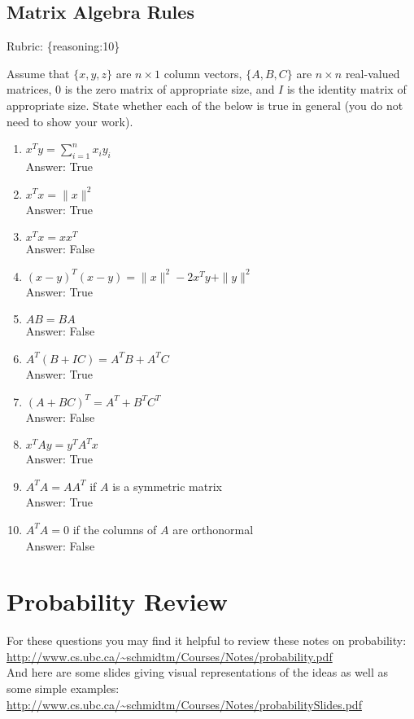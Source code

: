 \documentclass{article}
\def\rubric#1{\gre{Rubric: \{#1\}}}{}
\def\blu#1{{\color{blu}#1}}
\def\gre#1{{\color{gre}#1}}
\def\red#1{{\color{red}#1}}
\def\norm#1{\|#1\|}
\def\ans#1{\gre{Answer: #1}}{}
\begin{document}
\subsection{Matrix Algebra Rules}
\rubric{reasoning:10}

Assume that $\{x,y,z\}$ are $n \times 1$ column vectors, $\{A,B,C\}$ are $n \times n$ real-valued matrices, \red{$0$ is the zero matrix of appropriate size}, and $I$ is the identity matrix of appropriate size. \blu{State whether each of the below is true in general} (you do not need to show your work).

\begin{enumerate}
\item $x^Ty = \sum_{i=1}^n x_iy_i$ \\ \ans{True}
\item $x^Tx = \norm{x}^2$ \\ \ans{True}
\item $x^Tx = xx^T$ \\ \ans{False}
\item $(x-y)^T(x-y) = \norm{x}^2 - 2x^Ty + \norm{y}^2$ \\ \ans{True}
\item $AB=BA$ \\ \ans{False}
\item $A^T(B + IC) = A^TB + A^TC$ \\ \ans{True}
\item $(A + BC)^T = A^T + B^TC^T$ \\ \ans{False}
\item $x^TAy = y^TA^Tx$ \\ \ans{True}
\item $A^TA = AA^T$ if $A$ is a symmetric matrix \\ \ans{True}
\item $A^TA = 0$ if the columns of $A$ are orthonormal \\ \ans{False}
\end{enumerate}

\section{Probability Review}


For these questions you may find it helpful to review these notes on probability:\\
\url{http://www.cs.ubc.ca/~schmidtm/Courses/Notes/probability.pdf}\\
And here are some slides giving visual representations of the ideas as well as some simple examples:\\
\url{http://www.cs.ubc.ca/~schmidtm/Courses/Notes/probabilitySlides.pdf}
\end{document}
